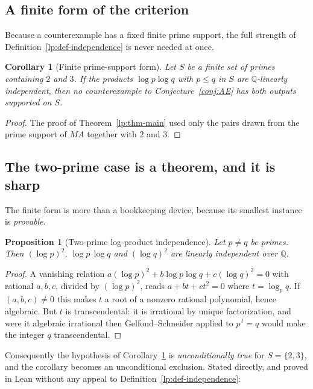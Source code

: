 \documentclass[11pt,oneside]{article}
\newtheorem{proposition}[theorem]{Proposition}
\newtheorem{corollary}[theorem]{Corollary}
\theoremstyle{definition}
\theoremstyle{remark}
\newcommand{\Q}{\mathbb Q}
\begin{document}
\subsection{A finite form of the criterion}

Because a counterexample has a fixed finite prime support, the full strength of
Definition~\ref{lp:def-independence} is never needed at once.

\begin{corollary}[Finite prime-support form]
\label{lp:cor-finite}
Let $S$ be a finite set of primes containing $2$ and $3$.  If the products $\log p\log q$ with
$p\le q$ in $S$ are $\Q$-linearly independent, then no counterexample to
Conjecture~\ref{conj:AE} has both outputs supported on $S$.
\end{corollary}

\begin{proof}
The proof of Theorem~\ref{lp:thm-main} used only the pairs drawn from the prime support of
$MA$ together with $2$ and $3$.
\end{proof}

\subsection{The two-prime case is a theorem, and it is sharp}
\label{lp:twoprime}

The finite form is more than a bookkeeping device, because its smallest instance is
\emph{provable}.

\begin{proposition}[Two-prime log-product independence]
\label{lp:prop-twoprime}
Let $p\neq q$ be primes.  Then $(\log p)^2$, $\log p\,\log q$ and $(\log q)^2$ are linearly
independent over $\Q$.
\end{proposition}

\begin{proof}
A vanishing relation $a(\log p)^2+b\log p\log q+c(\log q)^2=0$ with rational $a,b,c$, divided
by $(\log p)^2$, reads $a+bt+ct^2=0$ where $t=\log_p q$.  If $(a,b,c)\neq0$ this makes
$t$ a root of a nonzero rational polynomial, hence algebraic.  But $t$ is transcendental:
it is irrational by unique factorization, and were it algebraic irrational then
Gelfond--Schneider applied to $p^{\,t}=q$ would make the integer $q$ transcendental.
\end{proof}

Consequently the hypothesis of Corollary~\ref{lp:cor-finite} is \emph{unconditionally true}
for $S=\{2,3\}$, and the corollary becomes an unconditional exclusion.  Stated directly, and
proved in Lean without any appeal to Definition~\ref{lp:def-independence}:
\end{document}
